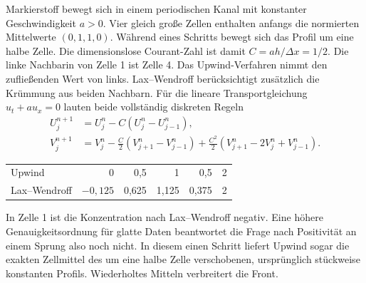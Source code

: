 Markierstoff bewegt sich in einem periodischen Kanal mit konstanter Geschwindigkeit \(a>0\). Vier gleich große Zellen enthalten anfangs die normierten Mittelwerte \((0,1,1,0)\). Während eines Schritts bewegt sich das Profil um eine halbe Zelle. Die dimensionslose Courant-Zahl ist damit \(C=ah/\Delta x=1/2\). Die linke Nachbarin von Zelle 1 ist Zelle 4.
Das Upwind-Verfahren nimmt den zufließenden Wert von links. Lax--Wendroff berücksichtigt zusätzlich die Krümmung aus beiden Nachbarn. Für die lineare Transportgleichung \(u_t+a u_x=0\) lauten beide vollständig diskreten Regeln
\begin{align*}
 U_j^{n+1}&=U_j^n-C(U_j^n-U_{j-1}^n),\\
 V_j^{n+1}&=V_j^n-\tfrac C2(V_{j+1}^n-V_{j-1}^n)
             +\tfrac{C^2}2(V_{j+1}^n-2V_j^n+V_{j-1}^n).
\end{align*}
{\tblstart\begin{tabularx}{\linewidth}{@{}Yrrrrr@{}}\toprule
{}&&&&&\\\midrule
Upwind&0&0,5&1&0,5&2\\
Lax--Wendroff&$-0{,}125$&0,625&1,125&0,375&2\\\bottomrule
\end{tabularx}\par}
In Zelle 1 ist die Konzentration nach Lax--Wendroff negativ. Eine höhere Genauigkeitsordnung für glatte Daten beantwortet die Frage nach Positivität an einem Sprung also noch nicht. In diesem einen Schritt liefert Upwind sogar die exakten Zellmittel des um eine halbe Zelle verschobenen, ursprünglich stückweise konstanten Profils. Wiederholtes Mitteln verbreitert die Front.


